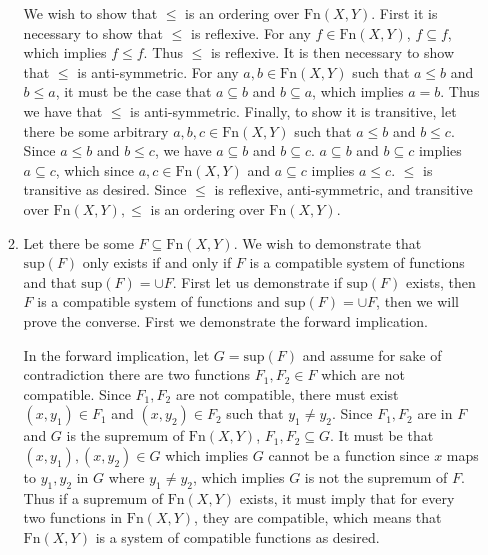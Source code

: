 \documentclass{article}
\begin{document}
\begin{enumerate}
\begin{enumerate}
	We wish to show that $\leq$ is an ordering over $\text{Fn}(X,Y)$. First it is necessary to show that $\leq$ is reflexive. For any $f \in \text{Fn}(X,Y)$, $f \subseteq f$, which implies $f \leq f$. Thus $\leq$ is reflexive. It is then necessary to show that $\leq$ is anti-symmetric. For any $a,b\in \text{Fn}(X,Y)$ such that $a \leq b$ and $b \leq a$, it must be the case that $a \subseteq b$ and $b \subseteq a$, which implies $a = b$. Thus we have that $\leq$ is anti-symmetric. Finally, to show it is transitive, let there be some arbitrary $a,b,c \in \text{Fn}(X,Y)$ such that $a \leq b$ and $b \leq c$. Since $a \leq b$ and $b \leq c$, we have $a \subseteq b$ and $b \subseteq c$. $a \subseteq b$ and $b \subseteq c$ implies $a \subseteq c$, which since $a,c \in \text{Fn}(X,Y)$ and $a \subseteq c$ implies $a \leq c$. $\leq$ is transitive as desired. Since $\leq$ is reflexive, anti-symmetric, and transitive over $\text{Fn}(X,Y), \leq$ is an ordering over $\text{Fn}(X,Y)$.
	
	\item 
	
	Let there be some $F \subseteq \text{Fn}(X,Y)$. We wish to demonstrate that $\text{sup} (F)$ only exists if and only if $F$ is a compatible system of functions and that $\text{sup} (F) = \cup F$. First let us demonstrate if $\text{sup} (F)$ exists, then $F$ is a compatible system of functions and $\text{sup} (F) = \cup F$, then we will prove the converse. First we demonstrate the forward implication.
	
	\medskip
	
	 In the forward implication, let $G = \text{sup} (F)$ and assume for sake of contradiction there are two functions $F_1, F_2 \in F$ which are not compatible. Since $F_1,F_2$ are not compatible, there must exist $(x,y_1) \in F_1$ and $(x,y_2) \in F_2$ such that $y_1 \neq y_2$. Since $F_1, F_2$ are in $F$ and $G$ is the supremum of $\text{Fn}(X,Y)$, $F_1, F_2 \subseteq G$. It must be that $(x,y_1), (x,y_2) \in G$ which implies $G$ cannot be a function since $x$ maps to $y_1,y_2$ in $G$ where $y_1 \neq y_2$, which implies $G$ is not the supremum of $F$. Thus if a supremum of $\text{Fn}(X,Y)$ exists, it must imply that for every two functions in $\text{Fn}(X,Y)$, they are compatible, which means that $\text{Fn}(X,Y)$ is a system of compatible functions as desired. 
	 
	 \medskip
	 

\end{enumerate}
\end{enumerate}
\end{document}
